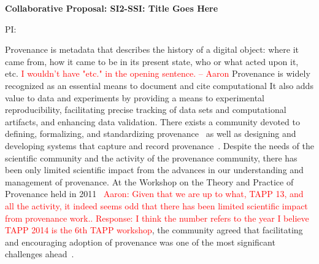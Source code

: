 \documentclass[10pt]{article}
\newcommand{\todo}[1]{\textcolor{red}{#1}}
\begin{document}
\thispagestyle{empty}
\begin{center}
{\large\bf Collaborative Proposal:  SI2-SSI: Title Goes Here}

\vspace{1ex}
PI: 
\end{center}



Provenance is metadata that describes the history of a digital object:
where it
came from, how it came to be in its present state, who or what acted upon it,
etc.  \todo{I wouldn't have "etc." in the opening sentence. -- Aaron}
Provenance is widely recognized as an essential means to document and cite
computational
It also adds value to data and experiments by providing a means to experimental
reproducibility, facilitating precise tracking of data sets and computational
artifacts, and enhancing data validation.
There exists a community devoted to defining,
formalizing, and standardizing 
provenance~\cite{buneman-archive,buneman-ww,cheney-da,cheney-wwh,opm}
as well as designing and developing systems that
capture and record
provenance~\cite{starflow,orchestra,provchallenge1,pass-usenix06,trio}.
Despite the needs of the scientific community and the activity of the
provenance community, there has been only limited scientific impact from
the advances in our understanding and management of provenance.
At the Workshop on the Theory and Practice of
Provenance held in 2011~\cite{tapp11} \todo{Aaron: Given that we are up to what, TAPP 13, and all the activity, it indeed seems odd that there has been limited scientific impact from provenance work..  Response:  I think the 
number refers to the year  I
believe TAPP 2014 is the 6th TAPP workshop},
the community agreed that facilitating and encouraging adoption of
provenance was one of the most significant challenges ahead~\cite{chapman11}.
\end{document}

